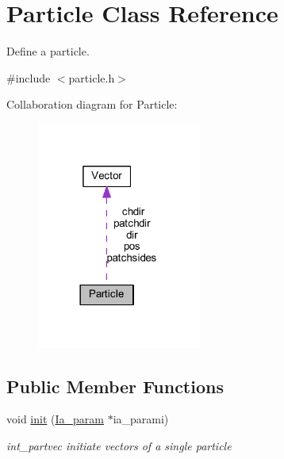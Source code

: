 \hypertarget{class_particle}{\section{Particle Class Reference}
\label{class_particle}
}


Define a particle.  




{\ttfamily \#include $<$particle.\+h$>$}



Collaboration diagram for Particle\+:\nopagebreak
\begin{figure}[H]
\begin{center}
\leavevmode
\includegraphics[width=153pt]{class_particle__coll__graph}
\end{center}
\end{figure}
\subsection*{Public Member Functions}
\begin{DoxyCompactItemize}
\item 
void \hyperlink{class_particle_a5770ca81df8dff0087a05261cea3fba0}{init} (\hyperlink{struct_ia__param}{Ia\+\_\+param} $\ast$ia\+\_\+parami)
\begin{DoxyCompactList}\small\item\em int\+\_\+partvec initiate vectors of a single particle \end{DoxyCompactList}\end{DoxyCompactItemize}
